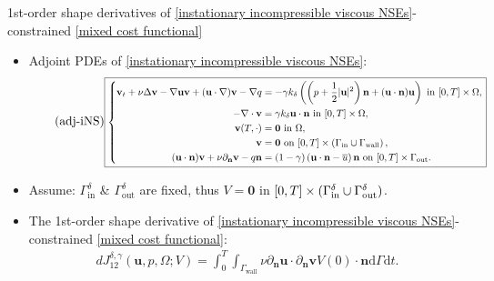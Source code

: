 \documentclass[10pt
hyperref={
    pdfauthor={Hong Quan Ba Nguyen},
    pdftitle={Optimal Shape Design of Air Ducts in Combustion Engines: Design a General Framework},
    pdfsubject={Talk},
    pdfcreator={LaTeX},
}
]{beamer}
\begin{document}
\begin{frame}{1st-order shape derivatives of \eqref{instationary incompressible viscous NSEs}-constrained \eqref{mixed cost functional}}
    \begin{itemize}
        \item Adjoint PDEs of \eqref{instationary incompressible viscous NSEs}:
        \begin{equation}
            \label{adjoint iNS}
            \tag{adj-iNS}
            \scalebox{0.8}{%
            \boxed{\left\{\begin{split}
                \textbf{v}_t + \nu\Delta\textbf{v} - \nabla\textbf{u}\textbf{v} + (\textbf{u}\cdot\nabla)\textbf{v} - \nabla q &= -\gamma k_\delta\left(\left(p + \frac{1}{2}|\textbf{u}|^2\right)\textbf{n} + (\textbf{u}\cdot\textbf{n})\textbf{u}\right) \mbox{ in } [0,T]\times\Omega,\\
                -\nabla\cdot\textbf{v} &= \gamma k_\delta\textbf{u}\cdot\textbf{n} \mbox{ in } [0,T]\times\Omega,\\
                \textbf{v}(T,\cdot) &= \textbf{0} \mbox{ in } \Omega,\\
                \textbf{v} &= \textbf{0} \mbox{ on } [0,T]\times\left(\Gamma_{\textrm{in}}\cup\Gamma_{\textrm{wall}}\right),\\
                (\textbf{u}\cdot\textbf{n})\textbf{v} + \nu\partial_{\textbf{n}}\textbf{v} - q\textbf{n} &= (1 - \gamma)\left(\textbf{u}\cdot\textbf{n} - \overline{u}\right)\textbf{n} \mbox{ on } [0,T]\times\Gamma_{\textrm{out}}.
            \end{split}\right.}}
        \end{equation}
        \item Assume: $\Gamma_{\textrm{in}}^\delta$ {\small\&} $\Gamma_{\textrm{out}}^\delta$ are fixed, thus $V = \textbf{0}$ in $[0,T]\times(\Gamma_{\textrm{in}}^\delta\cup\Gamma_{\rm out}^\delta)$.
        \item The 1st-order shape derivative of \eqref{instationary incompressible viscous NSEs}-constrained \eqref{mixed cost functional}:
        \begin{align}
            \label{shape derivative}
            \tag{dJ}
            dJ_{12}^{\delta,\gamma}(\textbf{u},p,\Omega;V) = \int_0^T\int_{\Gamma_{\textrm{wall}}} \nu\partial_{\textbf{n}}\textbf{u}\cdot\partial_{\textbf{n}}\textbf{v}V(0)\cdot\textbf{n}\textrm{d}\Gamma\textrm{d}t.
        \end{align}
    \end{itemize}
\end{frame}
\end{document}
